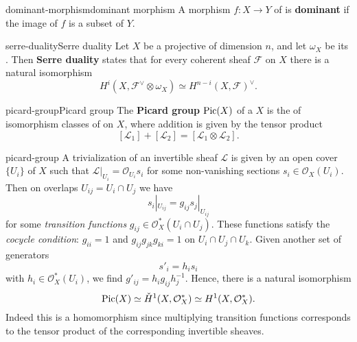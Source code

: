\begin{topic}{dominant-morphism}{dominant morphism}
    A morphism $f : X \to Y$ of  is \textbf{dominant} if the image of $f$ is a  subset of $Y$.
\end{topic}

\begin{topic}{serre-duality}{Serre duality}
    Let $X$ be a  projective  of dimension $n$, and let $\omega_X$ be its . Then \textbf{Serre duality} states that for every coherent sheaf $\mathcal{F}$ on $X$ there is a natural isomorphism
    \[ H^i(X, \mathcal{F}^\vee \otimes \omega_X) \simeq H^{n - i}(X, \mathcal{F})^\vee . \]
\end{topic}

\begin{topic}{picard-group}{Picard group}
    The \textbf{Picard group} $\textup{Pic}(X)$ of a  $X$ is the  of isomorphism classes of  on $X$, where addition is given by the tensor product
    \[ [\mathcal{L}_1] + [\mathcal{L}_2] = [\mathcal{L}_1 \otimes \mathcal{L}_2] . \]
\end{topic}

\begin{example}{picard-group}
    A trivialization of an invertible sheaf $\mathcal{L}$ is given by an open cover $\{ U_i \}$ of $X$ such that $\mathcal{L}|_{U_i} = \mathcal{O}_{U_i} s_i$ for some non-vanishing sections $s_i \in \mathcal{O}_X(U_i)$. Then on overlaps $U_{ij} = U_i \cap U_j$ we have
    \[ s_i|_{U_{ij}} = g_{ij} s_j|_{U_{ij}} \]
    for some \textit{transition functions} $g_{ij} \in \mathcal{O}_X^*(U_i \cap U_j)$. These functions satisfy the \textit{cocycle condition}: $g_{ii} = 1$ and $g_{ij} g_{jk} g_{ki} = 1$ on $U_i \cap U_j \cap U_k$. Given another set of generators
    \[ s'_i = h_i s_i \]
    with $h_i \in \mathcal{O}_X^*(U_i)$, we find $g'_{ij} = h_i g_{ij} h_j^{-1}$. Hence, there is a natural isomorphism
    \[ \textup{Pic}(X) \simeq \check{H}^1(X, \mathcal{O}_X^*) \simeq H^1(X, \mathcal{O}_X^*) . \]
    Indeed this is a homomorphism since multiplying transition functions corresponds to the tensor product of the corresponding invertible sheaves.
\end{example}

